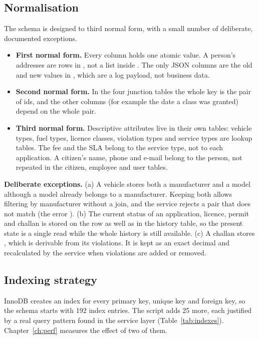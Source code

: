 \subsection{Normalisation}
The schema is designed to third normal form, with a small number of deliberate,
documented exceptions.
\begin{itemize}
\item \textbf{First normal form.} Every column holds one atomic value. A person's addresses are rows in , not a list inside . The only JSON columns are the old and new values in , which are a log payload, not business data.
\item \textbf{Second normal form.} In the four junction tables the whole key is the pair of ids, and the other columns (for example the date a class was granted) depend on the whole pair.
\item \textbf{Third normal form.} Descriptive attributes live in their own tables: vehicle types, fuel types, licence classes, violation types and service types are lookup tables. The fee and the SLA belong to the service type, not to each application. A citizen's name, phone and e-mail belong to the person, not repeated in the citizen, employee and user tables.
\end{itemize}
\textbf{Deliberate exceptions.}
(a) A vehicle stores both a manufacturer and a model although a model already belongs to
a manufacturer. Keeping both allows filtering by manufacturer without a join, and the
service rejects a pair that does not match (the error ).
(b) The current status of an application, licence, permit and challan is stored on the
row as well as in the history table, so the present state is a single read while the whole
history is still available.
(c) A challan stores , which is derivable from its violations. It is kept
as an exact decimal and recalculated by the service when violations are added or removed.

\subsection{Indexing strategy}
InnoDB creates an index for every primary key, unique key and foreign key, so the
schema starts with 192 index entries. The script  adds 25 more, each
justified by a real query pattern found in the service layer (Table~\ref{tab:indexes}).
Chapter~\ref{ch:perf} measures the effect of two of them.

